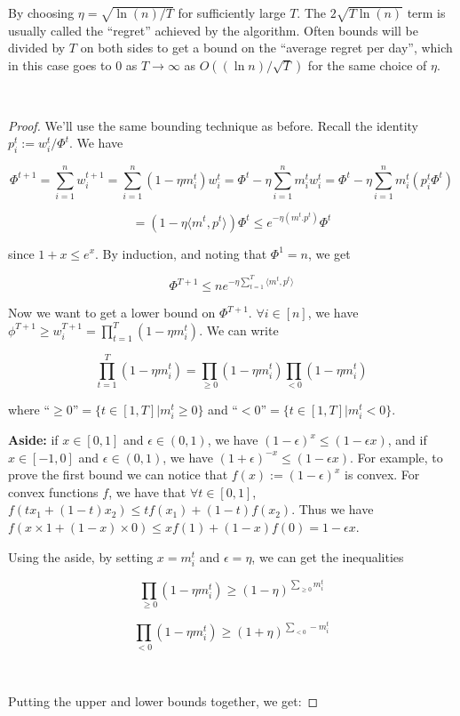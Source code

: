 \documentclass[11pt]{article}
\begin{document}
By choosing $\eta= \sqrt{\ln(n)/T}$ for sufficiently large $T$. The $2\sqrt{T \ln(n)}$ term is usually called the ``regret'' achieved by the algorithm. Often bounds will be divided by $T$ on both sides to get a bound on the ``average regret per day'', which in this case goes to $0$ as $T \rightarrow \infty$ as $O((\ln n)/\sqrt{T})$ for the same choice of $\eta$. 

\

\begin{proof} We'll use the same bounding technique as before. Recall the identity $p_i^t:=w_i^t/\Phi^t$. We have

$$\Phi^{t+1}=\sum_{i=1}^n w_i^{t+1}=\sum_{i=1}^n (1-\eta m_i^t)w_i^t=\Phi^t-\eta \sum_{i=1}^n m_i^t w_i^t =\Phi^t-\eta\sum_{i=1}^n m_i^t (p_i^t \Phi^t)$$

$$=(1-\eta\langle m^t, p^t \rangle) \Phi^t \leq e^{-\eta(m^t .p^t)} \Phi^t$$

since $1+x \leq e^x$. By induction, and noting that $\Phi^1=n$, we get

$$\Phi^{T+1} \leq n e^{-\eta  \sum_{t=1}^T \langle m^t ,p^t \rangle}$$

 

Now we want to get a lower bound on $\Phi^{T+1}$. $\forall i \in [n]$, we have $\phi^{T+1} \geq w_i^{T+1} =\prod_{t=1}^T (1-\eta m_i^t)$. We can write 

$$\prod_{t=1}^T (1-\eta m_i^t)=\prod_{ \geq 0} (1-\eta m_i^t) \prod_{<0} (1-\eta m_i^t)$$

where ``$\geq 0$''$=\{ t \in [1,T]| m_i^t \geq 0\}$ and ``$< 0$''$=\{ t \in [1,T]| m_i^t < 0\}$. 

\textbf{Aside:} if $x \in [0,1]$ and $\epsilon \in (0,1)$, we have $(1-\epsilon)^x \leq (1-\epsilon x)$, and if $x \in [-1,0]$ and $\epsilon \in (0,1)$, we have $(1+\epsilon)^{-x} \leq (1-\epsilon x)$. For example, to prove the first bound we can notice that $f(x):=(1-\epsilon)^x$ is convex. For convex functions $f$, we have that $\forall t \in [0,1]$, $f(tx_1+(1-t)x_2) \leq tf(x_1)+(1-t)f(x_2)$. Thus we have $f(x \times 1+(1-x) \times 0) \leq xf(1)+(1-x)f(0)=1-\epsilon x$. 

Using the aside, by setting $x=m_i^t$ and $\epsilon=\eta$, we can get the inequalities

$$ \prod_{ \geq 0} (1-\eta m_i^t) \geq (1-\eta)^{\sum_{\geq 0} m_i^t}$$


$$\prod_{<0} (1-\eta m_i^t) \geq (1+\eta)^{\sum_{<0} -m_i^t}$$


\

Putting the upper and lower bounds together, we get:


\end{proof}
\end{document}
